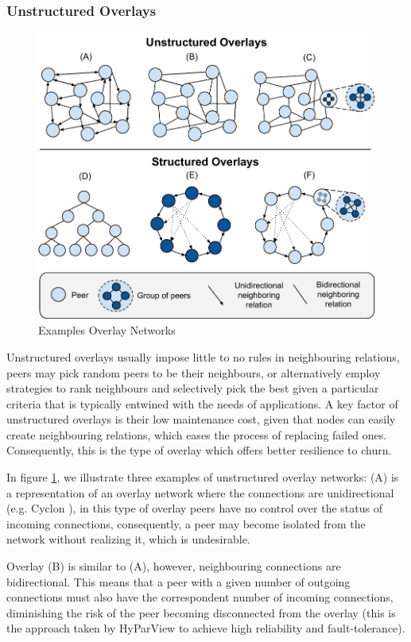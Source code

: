 \subsubsection*{Unstructured Overlays}

\begin{figure}
    \centering
    \includegraphics[width=0.60\linewidth]{Chapters/Figures/overlay_networks.pdf}
    \caption{Examples Overlay Networks}
    \label{fig:overlay_networks}
\end{figure}

Unstructured overlays usually impose little to no rules in neighbouring relations, peers may pick random peers to be their neighbours, or alternatively employ strategies to rank neighbours and selectively pick the best given a particular criteria that is typically entwined with the needs of applications. A key factor of unstructured overlays is their low maintenance cost, given that nodes can easily create neighbouring relations, which eases the process of replacing failed ones. Consequently, this is the type of overlay which offers better resilience to churn.

In figure \ref{fig:overlay_networks}, we illustrate three examples of unstructured overlay networks: (A) is a representation of an overlay network where the connections are unidirectional (e.g. Cyclon \cite{jelasity2007gossip}), in this type of overlay peers have no control over the status of incoming connections, consequently, a peer may become isolated from the network without realizing it, which is undesirable. 

Overlay (B) is similar to (A), however, neighbouring connections are bidirectional. This means that a peer with a given number of outgoing connections must also have the correspondent number of incoming connections, diminishing the risk of the peer becoming disconnected from the overlay (this is the approach taken by HyParView \cite{Hyparview} to achieve high reliability and fault-tolerance).

